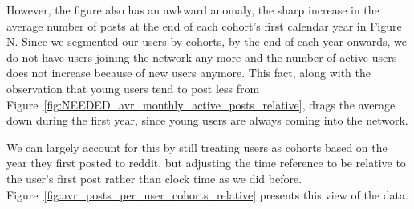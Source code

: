 However, the figure also has an awkward anomaly, the sharp increase in the average number of posts at the end of each cohort's first calendar year in Figure N.  Since we segmented our users by cohorts, by the end of each year onwards, we do not have users joining the network any more and the number of active users does not increase because of new users anymore. This fact, along with the observation that young users tend to post less from Figure~\ref{fig:NEEDED_avr_monthly_active_posts_relative}, drags the average down during the first year, since young users are always coming into the network.  


We can largely account for this by still treating users as cohorts based on the year they first posted to reddit, but adjusting the time reference to be relative to the user's first post rather than clock time as we did before.  Figure~\ref{fig:avr_posts_per_user_cohorts_relative} presents this view of the data.

